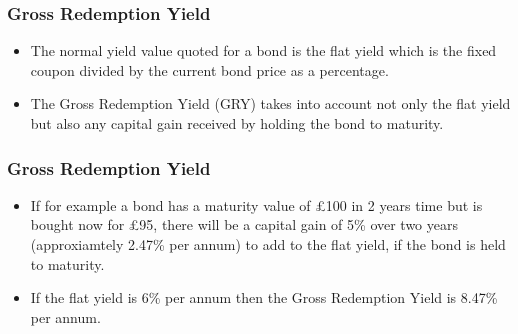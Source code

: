 \documentclass{beamer}
\begin{document}
\begin{frame}
\frametitle{Gross Redemption Yield}
\begin{itemize}
\item The normal yield value quoted for a bond is the flat yield which is the fixed coupon divided by the current bond price as a percentage. 

\item The Gross Redemption Yield (GRY) takes into account not only the flat yield but also any capital gain received by holding the bond to maturity.
\end{itemize}
\end{frame}
\begin{frame}
\frametitle{Gross Redemption Yield}
\begin{itemize}
\item If for example a bond has a maturity value of £100 in 2 years time but is bought now for £95, there will be a capital gain of 5\% over two years (approxiamtely 2.47\% per annum) to add to the flat yield, if the bond is held to maturity. 
\item If the flat yield is 6\% per annum then the Gross Redemption Yield is 8.47\% per annum.
\end{itemize}
\end{frame}
\end{document}
